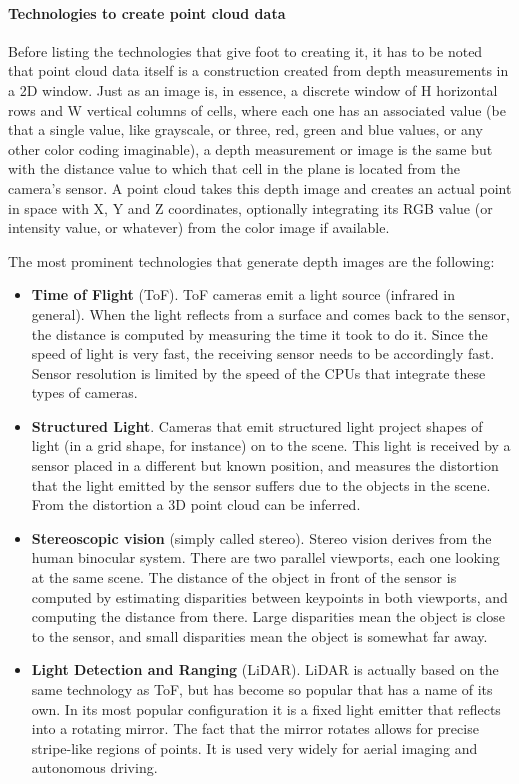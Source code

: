 \documentclass[../main.tex]{subfiles}
\begin{document}
\paragraph{Technologies to create point cloud data}
Before listing the technologies that give foot to creating it, it has to be noted that point cloud data itself is a construction created from depth measurements in a 2D window. Just as an image is, in essence, a discrete window of H horizontal rows and W vertical columns of cells, where each one has an associated value (be that a single value, like grayscale, or three, red, green and blue values, or any other color coding imaginable), a depth measurement or image is the same but with the distance value to which that cell in the plane is located from the camera's sensor. A point cloud takes this depth image and creates an actual point in space with X, Y and Z coordinates, optionally integrating its RGB value (or intensity value, or whatever) from the color image if available.

The most prominent technologies that generate depth images are the following:
\begin{itemize}
    \item \textbf{Time of Flight} (ToF). ToF cameras emit a light source (infrared in general). When the light reflects from a surface and comes back to the sensor, the distance is computed by measuring the time it took to do it. Since the speed of light is very fast, the receiving sensor needs to be accordingly fast. Sensor resolution is limited by the speed of the CPUs that integrate these types of cameras.
    \item \textbf{Structured Light}. Cameras that emit structured light project shapes of light (in a grid shape, for instance) on to the scene. This light is received by a sensor placed in a different but known position, and measures the distortion that the light emitted by the sensor suffers due to the objects in the scene. From the distortion a 3D point cloud can be inferred.
    \item \textbf{Stereoscopic vision} (simply called stereo). Stereo vision derives from the human binocular system. There are two parallel viewports, each one looking at the same scene. The distance of the object in front of the sensor is computed by estimating disparities between keypoints in both viewports, and computing the distance from there. Large disparities mean the object is close to the sensor, and small disparities mean the object is somewhat far away.
    \item \textbf{Light Detection and Ranging} (LiDAR). LiDAR is actually based on the same technology as ToF, but has become so popular that has a name of its own. In its most popular configuration it is a fixed light emitter that reflects into a rotating mirror. The fact that the mirror rotates allows for precise stripe-like regions of points. It is used very widely for aerial imaging and autonomous driving.
\end{itemize}
\end{document}
